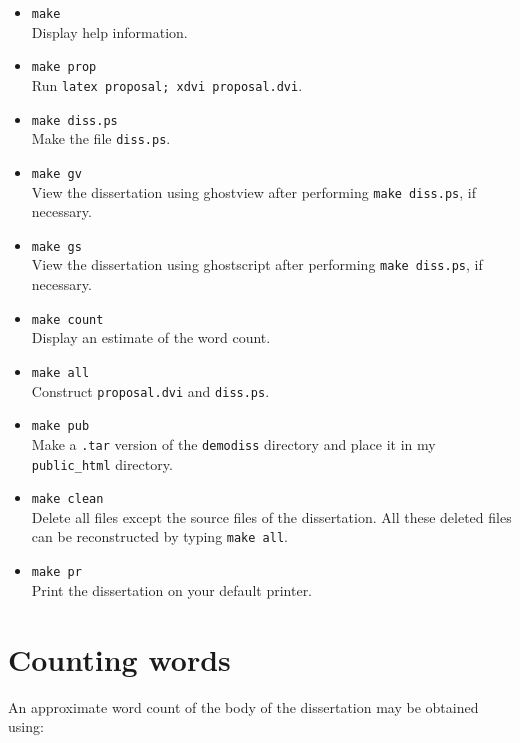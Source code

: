 \documentclass[12pt,twoside,notitlepage]{report}
\begin{document}
\begin{itemize}

\item{\tt make} \\
 Display help information.

\item{\tt make prop} \\
 Run {\tt latex proposal; xdvi proposal.dvi}.

\item{\tt make diss.ps} \\
 Make the file {\tt diss.ps}.

\item{\tt make gv} \\
 View the dissertation using ghostview after performing
{\tt make diss.ps}, if necessary.

\item{\tt make gs} \\
 View the dissertation using ghostscript after performing
{\tt make diss.ps}, if necessary.

\item{\tt make count} \\
Display an estimate of the word count.

\item{\tt make all} \\
Construct {\tt proposal.dvi} and {\tt diss.ps}.

\item{\tt make pub} \\ Make a {\tt .tar} version of the {\tt demodiss}
directory and place it in my {\tt public\_html} directory.

\item{\tt make clean} \\ Delete all files except the source files of
the dissertation. All these deleted files can be reconstructed by
typing {\tt make all}.

\item{\tt make pr} \\
Print the dissertation on your default printer.

\end{itemize}


\section{Counting words}

An approximate word count of the body of the dissertation may be
obtained using:
\end{document}
